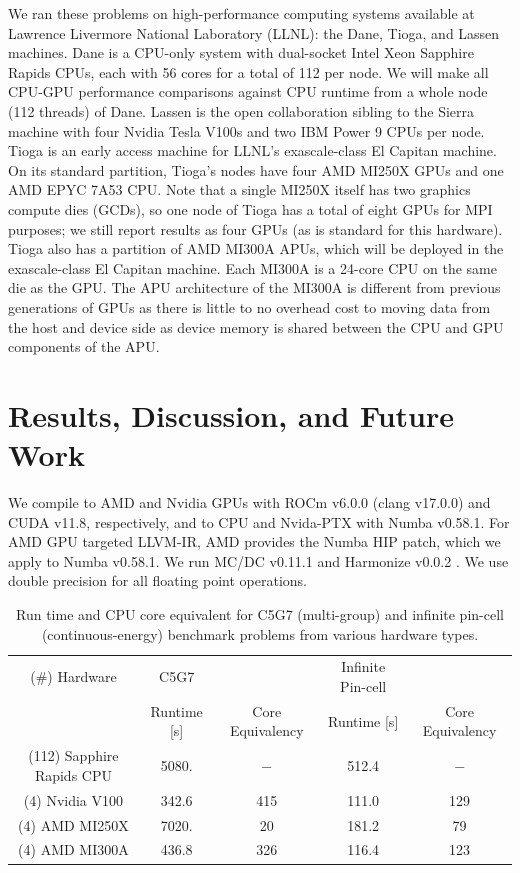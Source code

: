 We ran these problems on high-performance computing systems available at Lawrence Livermore National Laboratory (LLNL): the Dane, Tioga, and Lassen machines.
Dane is a CPU-only system with dual-socket Intel Xeon Sapphire Rapids CPUs, each with 56 cores for a total of 112 per node. 
We will make all CPU-GPU performance comparisons against CPU runtime from a whole node (112 threads) of Dane.
Lassen is the open collaboration sibling to the Sierra machine with four Nvidia Tesla V100s and two IBM Power 9 CPUs per node.
Tioga is an early access machine for LLNL's exascale-class El Capitan machine.
On its standard partition, Tioga's nodes have four AMD MI250X GPUs and one AMD EPYC 7A53 CPU.
Note that a single MI250X itself has two graphics compute dies (GCDs), so one node of Tioga has a total of eight GPUs for MPI purposes; we still report results as four GPUs (as is standard for this hardware).
Tioga also has a partition of AMD MI300A APUs, which will be deployed in the exascale-class El Capitan machine.
Each MI300A is a 24-core CPU on the same die as the GPU.
The APU architecture of the MI300A is different from previous generations of GPUs as there is little to no overhead cost to moving data from the host and device side as device memory is shared between the CPU and GPU components of the APU.

\section{Results, Discussion, and Future Work}

We compile to AMD and Nvidia GPUs with ROCm v6.0.0 (clang v17.0.0) and CUDA v11.8, respectively, 
and to CPU and Nvida-PTX with Numba v0.58.1.
For AMD GPU targeted LLVM-IR, AMD provides the Numba HIP patch, which we apply to Numba v0.58.1. %
We run MC/DC v0.11.1 \cite{transport_cement_mcdc_2024} and Harmonize v0.0.2 \cite{harmonize}.
We use double precision for all floating point operations.

\begin{table}[ht]
    \centering
    \caption{Run time and CPU core equivalent for C5G7 (multi-group) and infinite pin-cell (continuous-energy) benchmark problems from various hardware types.}
    \begin{tabular}{@{}c c c c c@{}}
        \hline
        (\#) Hardware & C5G7 & & Infinite Pin-cell & \\
        & Runtime [s] & Core Equivalency & Runtime [s] & Core Equivalency \\
        \hline
        (112) Sapphire Rapids CPU & 5080. & $-$ & 512.4 & $-$ \\
        (4) Nvidia V100 & 342.6 & 415 & 111.0 & 129 \\
        (4) AMD MI250X & 7020. & 20 & 181.2 & 79 \\
        (4) AMD MI300A & 436.8 & 326 & 116.4 & 123 \\
        \hline
    \end{tabular}
    \label{tab:runtime}
\end{table}


